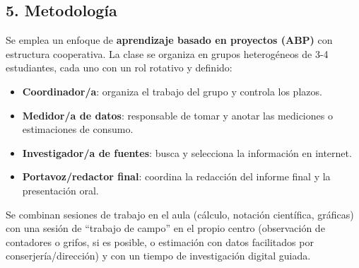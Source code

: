 \documentclass[11pt,a4paper]{article}
\begin{document}
\subsection*{5. Metodología}
Se emplea un enfoque de \textbf{aprendizaje basado en proyectos (ABP)} con estructura cooperativa. La clase se organiza en grupos heterogéneos de 3-4 estudiantes, cada uno con un rol rotativo y definido:
\begin{itemize}
    \item \textbf{Coordinador/a}: organiza el trabajo del grupo y controla los plazos.
    \item \textbf{Medidor/a de datos}: responsable de tomar y anotar las mediciones o estimaciones de consumo.
    \item \textbf{Investigador/a de fuentes}: busca y selecciona la información en internet.
    \item \textbf{Portavoz/redactor final}: coordina la redacción del informe final y la presentación oral.
\end{itemize}
Se combinan sesiones de trabajo en el aula (cálculo, notación científica, gráficas) con una sesión de ``trabajo de campo'' en el propio centro (observación de contadores o grifos, si es posible, o estimación con datos facilitados por conserjería/dirección) y con un tiempo de investigación digital guiada.
\end{document}
